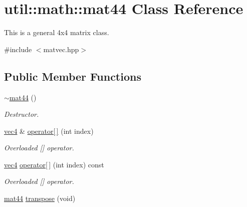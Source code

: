 \hypertarget{classutil_1_1math_1_1mat44}{\section{util\-:\-:math\-:\-:mat44 \-Class \-Reference}
\label{classutil_1_1math_1_1mat44}
}


\-This is a general 4x4 matrix class.  




{\ttfamily \#include $<$matvec.\-hpp$>$}

\subsection*{\-Public \-Member \-Functions}
\begin{DoxyCompactItemize}
\item 
\hypertarget{classutil_1_1math_1_1mat44_a9d158bbed0e09aa4a4bb8916cef3706b}{\hyperlink{classutil_1_1math_1_1mat44_a9d158bbed0e09aa4a4bb8916cef3706b}{$\sim$mat44} ()}\label{classutil_1_1math_1_1mat44_a9d158bbed0e09aa4a4bb8916cef3706b}

\begin{DoxyCompactList}\small\item\em \-Destructor. \end{DoxyCompactList}\item 
\hypertarget{classutil_1_1math_1_1mat44_acf10139b85dbe48e50067c5ec6f9d648}{\hyperlink{classutil_1_1math_1_1vec4}{vec4} \& \hyperlink{classutil_1_1math_1_1mat44_acf10139b85dbe48e50067c5ec6f9d648}{operator\mbox{[}$\,$\mbox{]}} (int index)}\label{classutil_1_1math_1_1mat44_acf10139b85dbe48e50067c5ec6f9d648}

\begin{DoxyCompactList}\small\item\em \-Overloaded \mbox{[}\mbox{]} operator. \end{DoxyCompactList}\item 
\hypertarget{classutil_1_1math_1_1mat44_ae89cc9f55d589a1e6333cd02fa83066b}{\hyperlink{classutil_1_1math_1_1vec4}{vec4} \hyperlink{classutil_1_1math_1_1mat44_ae89cc9f55d589a1e6333cd02fa83066b}{operator\mbox{[}$\,$\mbox{]}} (int index) const }\label{classutil_1_1math_1_1mat44_ae89cc9f55d589a1e6333cd02fa83066b}

\begin{DoxyCompactList}\small\item\em \-Overloaded \mbox{[}\mbox{]} operator. \end{DoxyCompactList}\item 
\hypertarget{classutil_1_1math_1_1mat44_a59e567180a4329f9c87395bfa0b6afc9}{\hyperlink{classutil_1_1math_1_1mat44}{mat44} \hyperlink{classutil_1_1math_1_1mat44_a59e567180a4329f9c87395bfa0b6afc9}{transpose} (void)}\label{classutil_1_1math_1_1mat44_a59e567180a4329f9c87395bfa0b6afc9}


\end{DoxyCompactItemize}
